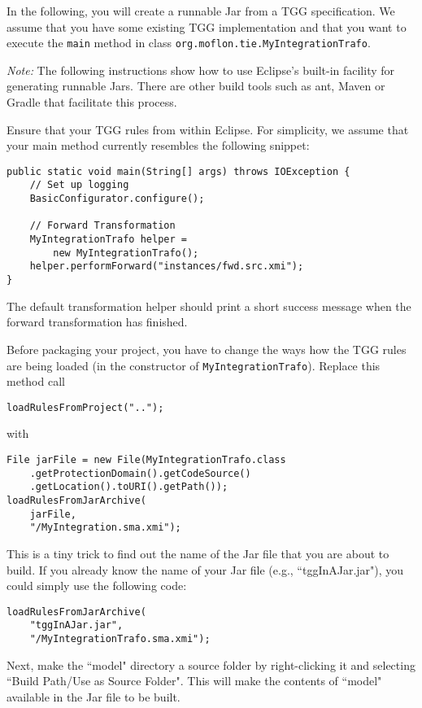 In the following, you will create a runnable Jar from a TGG specification.
We assume that you have some existing TGG implementation and that you want to execute the \texttt{main} method in class \texttt{org.moflon.tie.MyIntegration\-Trafo}.

\emph{Note:}
The following instructions show how to use Eclipse's built-in facility for generating runnable Jars.
There are other build tools such as ant, Maven or Gradle that facilitate this process.

\begin{stepbystep}
    
\item 
Ensure that your TGG rules from within Eclipse.
For simplicity, we assume that your main method currently resembles the following snippet:
\begin{lstlisting}
public static void main(String[] args) throws IOException {
    // Set up logging
    BasicConfigurator.configure();

    // Forward Transformation
    MyIntegrationTrafo helper = 
        new MyIntegrationTrafo();
    helper.performForward("instances/fwd.src.xmi");
}
\end{lstlisting}
The default transformation helper should print a short success message when the forward transformation has finished.

\item 
Before packaging your project, you have to change the ways how the TGG rules are being loaded (in the constructor of \texttt{MyIntegration\-Trafo}).
Replace this method call
\begin{lstlisting}
loadRulesFromProject("..");
\end{lstlisting}
with
\begin{lstlisting}
File jarFile = new File(MyIntegrationTrafo.class
    .getProtectionDomain().getCodeSource()
    .getLocation().toURI().getPath());
loadRulesFromJarArchive(
    jarFile,
    "/MyIntegration.sma.xmi");
\end{lstlisting}
This is a tiny trick to find out the name of the Jar file that you are about to build.
If you already know the name of your Jar file (e.g., ``tggInAJar.jar"), you could simply use the following code:
\begin{lstlisting}
loadRulesFromJarArchive(
    "tggInAJar.jar",
    "/MyIntegrationTrafo.sma.xmi");
\end{lstlisting}


\item 
Next, make the ``model" directory a source folder by right-clicking it and selecting ``Build Path/Use as Source Folder".
This will make the contents of ``model" available in the Jar file to be built.



\end{stepbystep}
